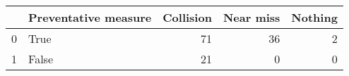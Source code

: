 \begin{tabular}{llrrr}
\toprule
{} &  Preventative measure &  Collision &  Near miss &  Nothing \\
\midrule
0 &                  True &         71 &         36 &        2 \\
1 &                 False &         21 &          0 &        0 \\
\bottomrule
\end{tabular}

